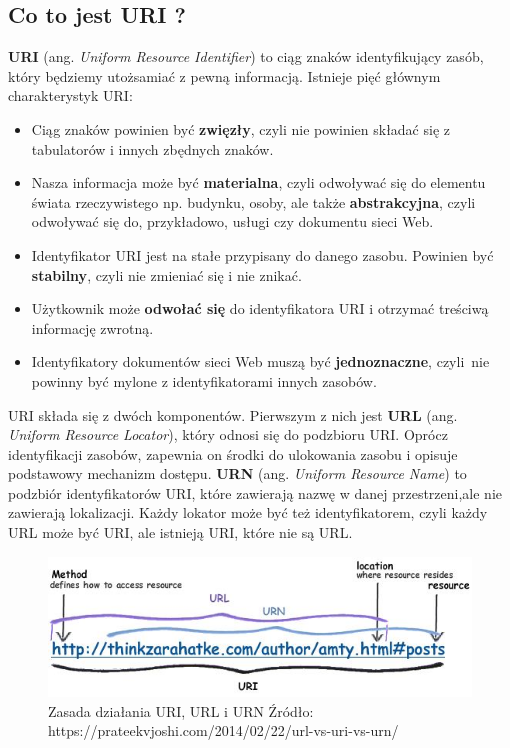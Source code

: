 \documentclass[oneside,polski,logo,indent]{amuthesis}
\begin{document}
\begin{center}
\subsection{Co to jest URI ?}
\end{center}
\textbf{URI} (ang. \emph{Uniform Resource Identifier}) to ciąg znaków identyfikujący zasób, który będziemy utożsamiać z pewną informacją. Istnieje pięć głównym charakterystyk URI:

\begin{itemize}
\item Ciąg znaków powinien być \textbf{zwięzły}, czyli nie powinien składać się z tabulatorów i innych zbędnych znaków.\newline
\item Nasza informacja może być \textbf{materialna}, czyli odwoływać się do elementu świata rzeczywistego np. budynku, osoby, ale także \textbf{abstrakcyjna}, czyli odwoływać się do, przykładowo, usługi czy dokumentu sieci Web.\newline
\item Identyfikator URI jest na stałe przypisany do danego zasobu. Powinien być \textbf{stabilny}, czyli nie zmieniać się i nie znikać.\newline
\item Użytkownik może \textbf{odwołać się} do identyfikatora URI i otrzymać treściwą informację zwrotną.\newline
\item Identyfikatory dokumentów sieci Web muszą być \textbf{jednoznaczne}, czyli~nie powinny być mylone z identyfikatorami innych zasobów.\newline
\end{itemize}
URI składa się z dwóch komponentów. Pierwszym z nich jest \textbf{URL} (ang. \emph{Uniform Resource Locator}), który odnosi się do podzbioru URI. Oprócz identyfikacji zasobów, zapewnia on środki do ulokowania zasobu i opisuje podstawowy mechanizm dostępu. \textbf{URN} (ang. \emph{Uniform Resource Name}) to podzbiór identyfikatorów URI, które zawierają nazwę w danej przestrzeni,\break ale nie zawierają lokalizacji. Każdy lokator może być też identyfikatorem, czyli każdy URL może być URI, ale istnieją URI, które nie są URL.

\begin{figure}[H]
\centering
\includegraphics[width=14cm]{uri.jpg}
\caption{Zasada działania URI, URL i URN\newline
Źródło: https://prateekvjoshi.com/2014/02/22/url-vs-uri-vs-urn/}
\label{Cache}
\end{figure}
\end{document}
